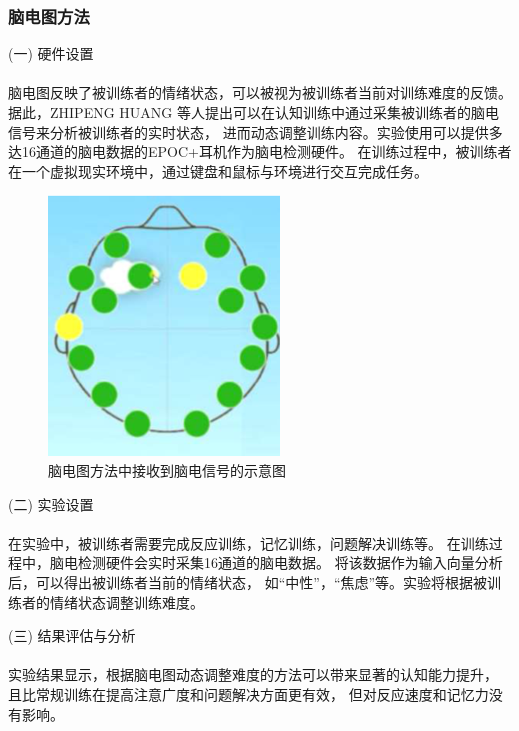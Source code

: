 \documentclass{article}
\begin{document}
            \subsubsection{脑电图方法}
            (一) 硬件设置\paragraph{}
            脑电图反映了被训练者的情绪状态，可以被视为被训练者当前对训练难度的反馈。
            据此，ZHIPENG HUANG \cite{ref9}等人提出可以在认知训练中通过采集被训练者的脑电信号来分析被训练者的实时状态，
            进而动态调整训练内容。实验使用可以提供多达16通道的脑电数据的EPOC+耳机作为脑电检测硬件。
            在训练过程中，被训练者在一个虚拟现实环境中，通过键盘和鼠标与环境进行交互完成任务。
            \begin{figure}[H]
            	\centering
            	\includegraphics[scale=0.8]{images/brain_distribute.png}
            	\caption{脑电图方法中接收到脑电信号的示意图}
            	\label{fig:label}
            \end{figure}
            (二) 实验设置\paragraph{}
            在实验中，被训练者需要完成反应训练，记忆训练，问题解决训练等。
            在训练过程中，脑电检测硬件会实时采集16通道的脑电数据。
            将该数据作为输入向量分析后，可以得出被训练者当前的情绪状态，
            如“中性”，“焦虑”等。实验将根据被训练者的情绪状态调整训练难度。

            (三) 结果评估与分析\paragraph{}
            实验结果显示，根据脑电图动态调整难度的方法可以带来显著的认知能力提升，
            且比常规训练在提高注意广度和问题解决方面更有效，
            但对反应速度和记忆力没有影响。
\end{document}
